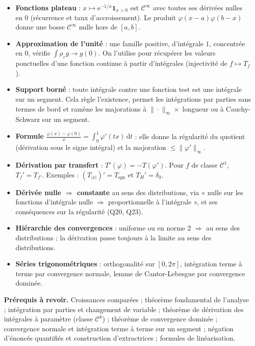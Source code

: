 \documentclass[11pt,a4paper]{article}
\providecommand{\tightlist}{\setlength{\itemsep}{0pt}\setlength{\parskip}{0pt}}
\begin{document}
\begin{itemize}
\tightlist
\item
  \textbf{Fonctions plateau} : \(x\mapsto\mathrm e^{-1/x}\mathbf 1_{x>0}\) est \(\mathcal C^\infty\) avec toutes ses dérivées nulles en \(0\) (récurrence et taux d'accroissement). Le produit \(\varphi(x-a)\varphi(b-x)\) donne une bosse \(\mathcal C^\infty\) nulle hors de \([a,b]\).
\item
  \textbf{Approximation de l'unité} : une famille positive, d'intégrale \(1\), concentrée en \(0\), vérifie \(\int\rho_\varepsilon g\to g(0)\). On l'utilise pour récupérer les valeurs ponctuelles d'une fonction continue à partir d'intégrales (injectivité de \(f\mapsto T_f\)).
\item
  \textbf{Support borné} : toute intégrale contre une fonction test est une intégrale sur un segment. Cela règle l'existence, permet les intégrations par parties sans termes de bord et ramène les majorations à \(\|\cdot\|_\infty\times\) longueur ou à Cauchy-Schwarz sur un segment.
\item
  \textbf{Formule \(\frac{\varphi(x)-\varphi(0)}x=\int_0^1\varphi'(tx)\,\mathrm dt\)} : elle donne la régularité du quotient (dérivation sous le signe intégral) et la majoration \(\leqslant\|\varphi'\|_\infty\).
\item
  \textbf{Dérivation par transfert} : \(T'(\varphi)=-T(\varphi')\). Pour \(f\) de classe \(\mathcal C^1\), \(T_f'=T_{f'}\). Exemples : \((T_{|x|})'=T_{\operatorname{sgn}}\) et \(T_H'=\delta_0\).
\item
  \textbf{Dérivée nulle \(\Rightarrow\) constante} au sens des distributions, via « nulle sur les fonctions d'intégrale nulle \(\Rightarrow\) proportionnelle à l'intégrale », et ses conséquences sur la régularité (Q20, Q23).
\item
  \textbf{Hiérarchie des convergences} : uniforme ou en norme \(2\) \(\Rightarrow\) au sens des distributions ; la dérivation passe toujours à la limite au sens des distributions.
\item
  \textbf{Séries trigonométriques} : orthogonalité sur \([0,2\pi]\), intégration terme à terme par convergence normale, lemme de Cantor-Lebesgue par convergence dominée.
\end{itemize}

\textbf{Prérequis à revoir.} Croissances comparées ; théorème fondamental de l'analyse ; intégration par parties et changement de variable ; théorème de dérivation des intégrales à paramètre (classe \(\mathcal C^k\)) ; théorème de convergence dominée ; convergence normale et intégration terme à terme sur un segment ; négation d'énoncés quantifiés et construction d'extractrices ; formules de linéarisation.
\end{document}
